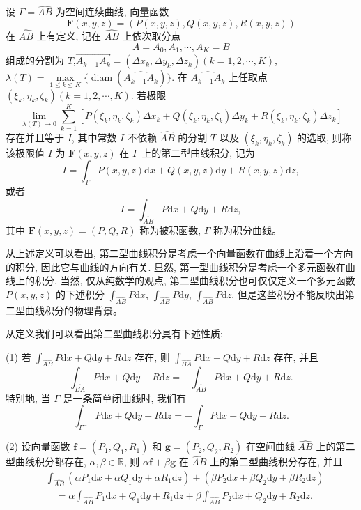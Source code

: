 \documentclass[12pt,fontset=fandol]{ctexart}
\begin{document}
\begin{definition}\label{course-definition-16-2-1}\quad 设 $\Gamma=\widehat{AB}$ 为空间连续曲线, 向量函数
\[
  \boldsymbol F(x,y,z)=(P(x,y,z),Q(x,y,z),R(x,y,z))
\]
在 $\widehat{AB}$ 上有定义, 记在 $\widehat{AB}$ 上依次取分点
\[
  A=A_0,A_1,\cdots,A_K=B
\]
组成的分割为 $T$,\allowbreak $\overrightarrow{A_{k-1}A_k}=(\Delta x_k,\Delta y_k,\Delta z_k)(k=1,2,\cdots,K)$, $\lambda(T)=\max\limits_{1\leqslant k\leqslant K}\{\operatorname{diam}(\widehat{A_{k-1}A_k})\}$. 在 $\widehat{A_{k-1}A_k}$ 上任取点 $(\xi_k,\eta_k,\zeta_k)(k=1,2,\cdots,K)$. 若极限
\[
  \lim_{\lambda(T)\to0}\sum_{k=1}^K
  [P(\xi_k,\eta_k,\zeta_k)\Delta x_k
  +Q(\xi_k,\eta_k,\zeta_k)\Delta y_k
  +R(\xi_k,\eta_k,\zeta_k)\Delta z_k]
\]
存在并且等于 $I$, 其中常数 $I$ 不依赖 $\widehat{AB}$ 的分割 $T$ 以及 $(\xi_k,\eta_k,\zeta_k)$ 的选取, 则称该极限值 $I$ 为 $\boldsymbol F(x,y,z)$ 在 $\Gamma$ 上的第二型曲线积分, 记为
\[
  I=\int_\Gamma P(x,y,z)\mathrm dx+Q(x,y,z)\mathrm dy+R(x,y,z)\mathrm dz,
\]
或者
\[
  I=\int_{\widehat{AB}}P\mathrm dx+Q\mathrm dy+R\mathrm dz,
\]
其中 $\boldsymbol F(x,y,z)=(P,Q,R)$ 称为被积函数, $\Gamma$ 称为积分曲线。

从上述定义可以看出, 第二型曲线积分是考虑一个向量函数在曲线上沿着一个方向的积分, 因此它与曲线的方向有关. 显然, 第一型曲线积分是考虑一个多元函数在曲线上的积分. 当然, 仅从纯数学的观点, 第二型曲线积分也可仅仅定义一个多元函数 $P(x,y,z)$ 的下述积分 $\int_{\widehat{AB}}P\mathrm dx$, $\int_{\widehat{AB}}P\mathrm dy$, $\int_{\widehat{AB}}P\mathrm dz$. 但是这些积分不能反映出第二型曲线积分的物理背景。

从定义我们可以看出第二型曲线积分具有下述性质:

(1) 若 $\int_{\widehat{AB}}P\mathrm dx+Q\mathrm dy+R\mathrm dz$ 存在, 则 $\int_{\widehat{BA}}P\mathrm dx+Q\mathrm dy+R\mathrm dz$ 存在, 并且
\[
  \int_{\widehat{BA}}P\mathrm dx+Q\mathrm dy+R\mathrm dz
  =-\int_{\widehat{AB}}P\mathrm dx+Q\mathrm dy+R\mathrm dz.
\]
特别地, 当 $\Gamma$ 是一条简单闭曲线时, 我们有
\[
  \int_{\Gamma^-}P\mathrm dx+Q\mathrm dy+R\mathrm dz
  =-\int_\Gamma P\mathrm dx+Q\mathrm dy+R\mathrm dz.
\]

(2) 设向量函数 $\boldsymbol f=(P_1,Q_1,R_1)$ 和 $\boldsymbol g=(P_2,Q_2,R_2)$ 在空间曲线 $\widehat{AB}$ 上的第二型曲线积分都存在, $\alpha,\beta\in\mathbb R$, 则 $\alpha\boldsymbol f+\beta\boldsymbol g$ 在 $\widehat{AB}$ 上的第二型曲线积分存在, 并且
\[
\begin{aligned}
  &\int_{\widehat{AB}}(\alpha P_1\mathrm dx+\alpha Q_1\mathrm dy+\alpha R_1\mathrm dz)
  +(\beta P_2\mathrm dx+\beta Q_2\mathrm dy+\beta R_2\mathrm dz)\\
  &\quad=\alpha\int_{\widehat{AB}}P_1\mathrm dx+Q_1\mathrm dy+R_1\mathrm dz
  +\beta\int_{\widehat{AB}}P_2\mathrm dx+Q_2\mathrm dy+R_2\mathrm dz.
\end{aligned}
\]


\end{definition}
\end{document}

